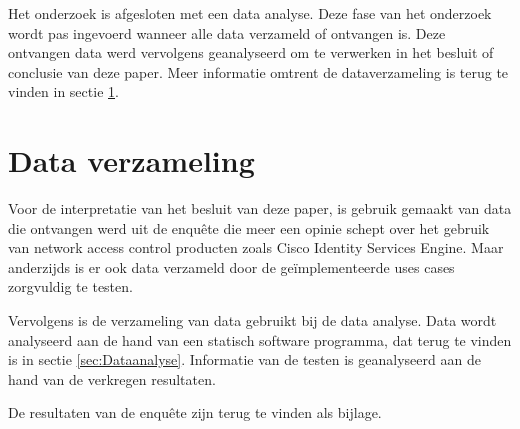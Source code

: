 \newline
\newline
Het onderzoek is afgesloten met een data analyse. Deze fase van het onderzoek wordt pas ingevoerd wanneer alle data verzameld of ontvangen is. Deze ontvangen data werd vervolgens geanalyseerd om te verwerken in het besluit of conclusie van deze paper. Meer informatie omtrent de dataverzameling is terug te vinden in sectie \ref{sec:Dataverzameling}. 

\section{Data verzameling}
\label{sec:Dataverzameling}
Voor de interpretatie van het besluit van deze paper, is gebruik gemaakt van data die ontvangen werd uit de enquête die meer een opinie schept over het gebruik van network access control producten zoals Cisco Identity Services Engine. Maar anderzijds is er ook data verzameld door de geïmplementeerde uses cases zorgvuldig te testen.

Vervolgens is de verzameling van data gebruikt bij de data analyse. Data wordt analyseerd aan de hand van een statisch software programma, dat terug te vinden is in sectie \ref{sec:Dataanalyse}. Informatie van de testen is geanalyseerd aan de hand van de verkregen resultaten. 

De resultaten van de enquête zijn terug te vinden als bijlage.

